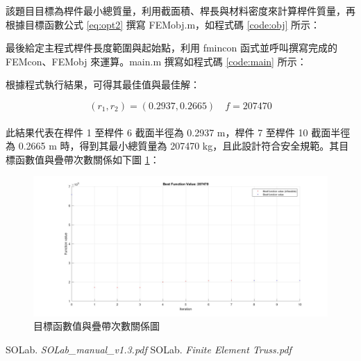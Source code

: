 \documentclass[12pt, a4paper]{article}
\begin{document}
\begin{enumerate}
    
    
    
    
    該題目目標為桿件最小總質量，利用截面積、桿長與材料密度來計算桿件質量，再根據目標函數公式 \ref{eq:opt2} 撰寫 FEMobj.m，如程式碼 \ref{code:obj} 所示：
    
    
    
    最後給定主程式桿件長度範圍與起始點，利用 fmincon 函式並呼叫撰寫完成的 FEMcon、FEMobj 來運算。main.m 撰寫如程式碼 \ref{code:main} 所示：
    
    
    
    根據程式執行結果，可得其最佳值與最佳解：
    
    \begin{displaymath}
        (r_1,r_2) = (0.2937,0.2665) \quad f = 207470
    \end{displaymath}\\
    此結果代表在桿件 1 至桿件 6 截面半徑為 0.2937 m，桿件 7 至桿件 10 截面半徑為 0.2665 m 時，得到其最小總質量為 207470 kg，且此設計符合安全規範。其目標函數值與疊帶次數關係如下圖 \ref{f:result}：
    
    \begin{figure}[h]
        \centering
        \includegraphics[width=17cm]{./pic/result}
        \caption{目標函數值與疊帶次數關係圖}
        \label{f:result}
    \end{figure}
    
\end{enumerate}
\clearpage

\begin{thebibliography}{}
    SOLab.  
    \textit{SOLab\_manual\_v1.3.pdf}
    SOLab. 
    \textit{Finite Element Truss.pdf}
\end{thebibliography}
\end{document}
